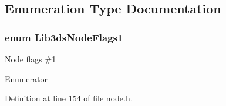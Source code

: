 \subsection{Enumeration Type Documentation}
\hypertarget{group__node_ga91c70cef0987f62c000e796e8875653d}{
\subsubsection[{Lib3ds\-Node\-Flags1}]{\setlength{\rightskip}{0pt plus 5cm}enum {\bf Lib3ds\-Node\-Flags1}}}\label{group__node_ga91c70cef0987f62c000e796e8875653d}
Node flags \#1 \begin{Desc}
\item[Enumerator]\par
\begin{description}
\item[{\em 
\hypertarget{group__node_gga91c70cef0987f62c000e796e8875653dadc5e55b8eefb7a574414782f7ebca8e0}{L\-I\-B3\-D\-S\-\_\-\-H\-I\-D\-D\-E\-N}\label{group__node_gga91c70cef0987f62c000e796e8875653dadc5e55b8eefb7a574414782f7ebca8e0}
}]\end{description}
\end{Desc}


Definition at line 154 of file node.\-h.

